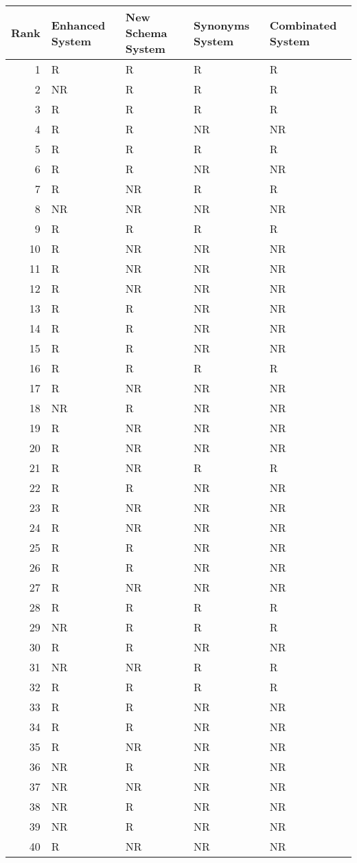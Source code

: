 \begin{tabular}{rllll}
\toprule
Rank & Enhanced System & New Schema System & Synonyms System & Combinated System \\
\midrule
1 & R & R & R & R \\
2 & NR & R & R & R \\
3 & R & R & R & R \\
4 & R & R & NR & NR \\
5 & R & R & R & R \\
6 & R & R & NR & NR \\
7 & R & NR & R & R \\
8 & NR & NR & NR & NR \\
9 & R & R & R & R \\
10 & R & NR & NR & NR \\
11 & R & NR & NR & NR \\
12 & R & NR & NR & NR \\
13 & R & R & NR & NR \\
14 & R & R & NR & NR \\
15 & R & R & NR & NR \\
16 & R & R & R & R \\
17 & R & NR & NR & NR \\
18 & NR & R & NR & NR \\
19 & R & NR & NR & NR \\
20 & R & NR & NR & NR \\
21 & R & NR & R & R \\
22 & R & R & NR & NR \\
23 & R & NR & NR & NR \\
24 & R & NR & NR & NR \\
25 & R & R & NR & NR \\
26 & R & R & NR & NR \\
27 & R & NR & NR & NR \\
28 & R & R & R & R \\
29 & NR & R & R & R \\
30 & R & R & NR & NR \\
31 & NR & NR & R & R \\
32 & R & R & R & R \\
33 & R & R & NR & NR \\
34 & R & R & NR & NR \\
35 & R & NR & NR & NR \\
36 & NR & R & NR & NR \\
37 & NR & NR & NR & NR \\
38 & NR & R & NR & NR \\
39 & NR & R & NR & NR \\
40 & R & NR & NR & NR \\
\bottomrule
\end{tabular}
